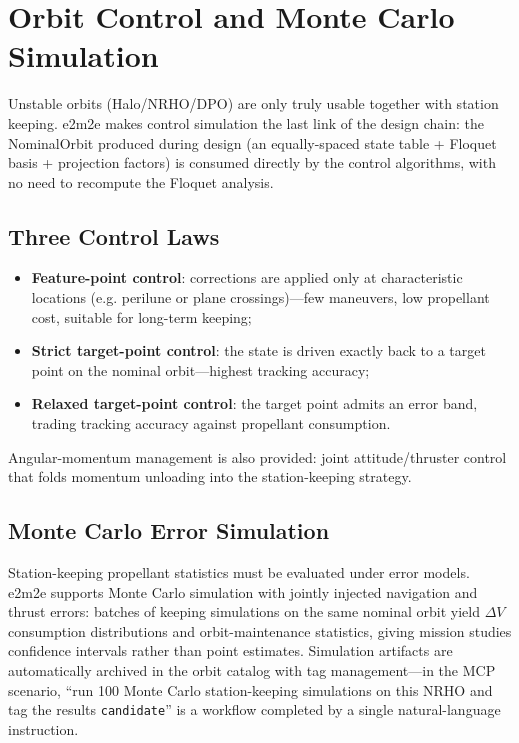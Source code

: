 \section{Orbit Control and Monte Carlo Simulation}
\label{sec:control}

Unstable orbits (Halo/NRHO/DPO) are only truly usable together with station
keeping. e2m2e makes control simulation the last link of the design chain:
the NominalOrbit produced during design (an equally-spaced state table +
Floquet basis + projection factors) is consumed directly by the control
algorithms, with no need to recompute the Floquet analysis.

\subsection{Three Control Laws}

\begin{itemize}
  \item \textbf{Feature-point control}: corrections are applied only at
        characteristic locations (e.g. perilune or plane crossings)---few
        maneuvers, low propellant cost, suitable for long-term keeping;
  \item \textbf{Strict target-point control}: the state is driven exactly
        back to a target point on the nominal orbit---highest tracking
        accuracy;
  \item \textbf{Relaxed target-point control}: the target point admits an
        error band, trading tracking accuracy against propellant consumption.
\end{itemize}

Angular-momentum management is also provided: joint attitude/thruster control
that folds momentum unloading into the station-keeping strategy.

\subsection{Monte Carlo Error Simulation}

Station-keeping propellant statistics must be evaluated under error models.
e2m2e supports Monte Carlo simulation with jointly injected navigation and
thrust errors: batches of keeping simulations on the same nominal orbit yield
$\Delta V$ consumption distributions and orbit-maintenance statistics, giving
mission studies confidence intervals rather than point estimates. Simulation
artifacts are automatically archived in the orbit catalog with tag
management---in the MCP scenario, ``run 100 Monte Carlo station-keeping
simulations on this NRHO and tag the results \texttt{candidate}'' is a
workflow completed by a single natural-language instruction.
